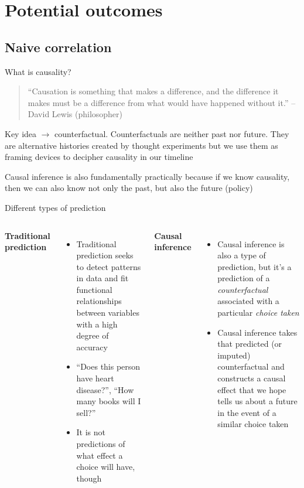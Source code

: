 \documentclass{beamer}
\begin{document}
\section{Potential outcomes}

\subsection{Naive correlation}

\begin{frame}{What is causality?}

  \begin{quote}
    ``Causation is something that makes a difference, and the difference it makes must be a difference from what would have happened without it.'' -- David Lewis (philosopher)
  \end{quote}

  \bigskip
  Key idea $\rightarrow$ counterfactual. Counterfactuals are neither past nor future.  They are alternative histories created by thought experiments but we use them as framing devices to decipher causality in our timeline

  \bigskip

  Causal inference is also fundamentally practically because if we know causality, then we can also know not only the past, but also the future (policy)

\end{frame}

\begin{frame}{Different types of prediction}

  \begin{columns}
    \centering
    \textbf{Traditional prediction}
    \begin{itemize}
      \item Traditional prediction seeks to detect patterns in data and fit functional relationships between variables with a high degree of accuracy
      \item ``Does this person have heart disease?'', ``How many books will I sell?''
      \item It is not predictions of what effect a choice will have, though
    \end{itemize}
    \centering
    \textbf{Causal inference}
    \begin{itemize}
      \item Causal inference is also a type of prediction, but it's a prediction of a \emph{counterfactual} associated with a particular \emph{choice taken}
      \item Causal inference takes that predicted (or imputed) counterfactual and constructs a causal effect that we hope tells us about a future in the event of a similar choice taken
    \end{itemize}
  \end{columns}
\end{frame}
\end{document}
